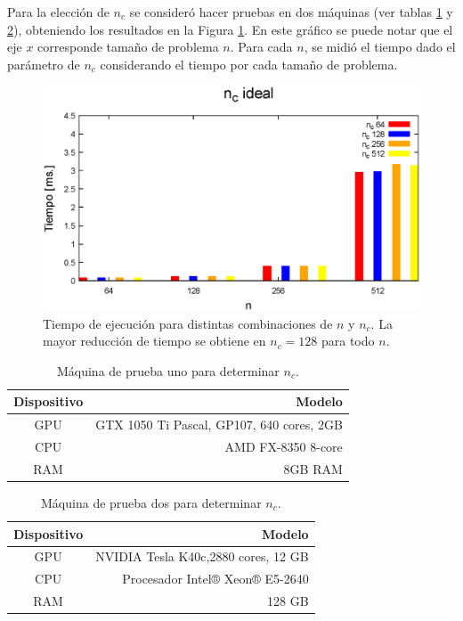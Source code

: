\documentclass[10pt, conference, compsocconf, onecolumn]{IEEEtran}
\begin{document}
 Para la elecci\'on de $n_{c}$ se consider\'o hacer pruebas en dos m\'aquinas (ver tablas \ref{table_gtx1050_nc} y \ref{table_TeslaK40_nc}), obteniendo los resultados en la Figura \ref{fig_N_Corte_Ideal}. En este gr\'afico se puede notar que el eje $x$ corresponde tama\~no de problema $n$. Para cada $n$, se midi\'o el tiempo dado el par\'ametro de $n_{c}$ considerando el tiempo por cada tama\~no de problema.
 
  \begin{figure}[H]
  	\centering
  	\includegraphics[scale=0.45]{figures/nideal_aphopis.eps}
  	\caption{Tiempo de ejecuci\'on  para distintas combinaciones de $n$ y $n_{c}$. La mayor reducci\'on de tiempo se obtiene en $n_{c}=128$ para todo $n$. }
  	\label{fig_N_Corte_Ideal}
  \end{figure}
  
 \begin{table}[H]
 	\normalsize
 	\caption{M\'aquina de prueba uno para determinar $n_{c}$.}
 	\begin{center}
 		\begin{tabular}{|c|r|}
 			\hline
 			Dispositivo	&	Modelo\\
 			\hline
 			GPU	&	GTX 1050 Ti Pascal, GP107, 640 cores, 2GB\\
 			CPU	&	AMD FX-8350 8-core\\
 			RAM	&	8GB RAM\\
 			\hline
 		\end{tabular}
 	\end{center}
 	\label{table_gtx1050_nc}
 \end{table}
 
 \begin{table}[H]
 	\normalsize
 	\caption{M\'aquina de prueba dos para determinar $n_{c}$.}
 	\begin{center}
 		\begin{tabular}{|c|r|}
 			\hline
 			Dispositivo	&	Modelo\\
 			\hline
 			GPU	&	NVIDIA Tesla K40c,2880 cores, 12 GB\\
 			CPU	&	Procesador Intel® Xeon® E5-2640\\
 			RAM	&	128 GB\\
 			\hline
 		\end{tabular}
 	\end{center}
 	\label{table_TeslaK40_nc}
 \end{table}
 
\end{document}
